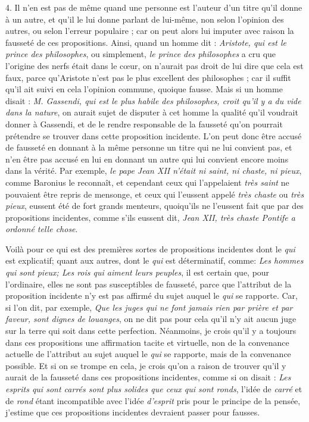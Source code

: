 \bigbreak
{4.} Il n'en est pas de même quand une personne est l'auteur d'un titre qu'il donne à un autre, et qu'il le lui donne parlant de lui-même, non selon l'opinion des autres, ou selon l'erreur populaire ; car on peut alors lui imputer avec raison la fausseté de ces propositions. Ainsi, quand un homme dit : \emph{Aristote, qui est le prince des philosophes}, ou simplement, \emph{le prince des philosophes} a cru que l'origine des nerfs était dans le cœur, on n'aurait pas droit de lui dire que cela est faux, parce qu'Aristote n'est pas le plus excellent des philosophes ; car il suffit qu'il ait suivi en cela l'opinion commune, quoique fausse. Mais si un homme disait : \emph{M. Gassendi, qui est le plus habile des philosophes, croit qu'il y a du vide dans la nature}, on aurait sujet de disputer à cet homme la qualité qu'il voudrait donner à Gassendi, et de le rendre responsable de la fausseté qu'on pourrait prétendre se trouver dans cette proposition incidente. L'on peut donc être accusé de fausseté en donnant à la même personne un titre qui ne lui convient pas, et n'en être pas accusé en lui en donnant un autre qui lui convient encore moins dans la vérité. Par exemple, \emph{le pape Jean XII n'était ni saint, ni chaste, ni pieux}, comme Baronius le reconnaît, et cependant ceux qui l'appelaient \emph{très saint} ne pouvaient être repris de mensonge, et ceux qui l'eussent appelé \emph{très chaste} ou \emph{très pieux}, eussent été de fort grands menteurs, quoiqu'ils ne l'eussent fait que par des propositions incidentes, comme s'ils eussent dit, \emph{Jean XII, très chaste Pontife a ordonné telle chose}.

\bigbreak
Voilà pour ce qui est des premières sortes de propositions incidentes dont le \emph{qui} est explicatif; quant aux autres, dont le \emph{qui} est déterminatif, comme: \emph{Les hommes qui sont pieux; Les rois qui aiment leurs peuples}, il est certain que, pour l'ordinaire, elles ne sont pas susceptibles de fausseté, parce que l'attribut de la proposition incidente n'y est pas affirmé du sujet auquel le \emph{qui} se rapporte. Car, si l'on dit, par exemple, \emph{Que les juges qui ne font jamais rien par prière et par faveur, sont dignes de louanges}, on ne dit pas pour cela qu'il n'y ait aucun juge sur la terre qui soit dans cette perfection. Néanmoins, je crois qu'il y a toujours dans ces propositions une affirmation tacite et virtuelle, non de la convenance actuelle de l'attribut au sujet auquel le \emph{qui} se rapporte, mais de la convenance possible. Et si on se trompe en cela, je crois qu'on a raison de trouver qu'il y aurait de la fausseté dans ces propositions incidentes, comme si on disait : \emph{Les esprits qui sont carrés sont plus solides que ceux qui sont ronds}, l'idée de \emph{carré} et de \emph{rond} étant incompatible avec l'idée \emph{d'esprit} pris pour le principe de la pensée, j'estime que ces propositions incidentes devraient passer pour fausses.


